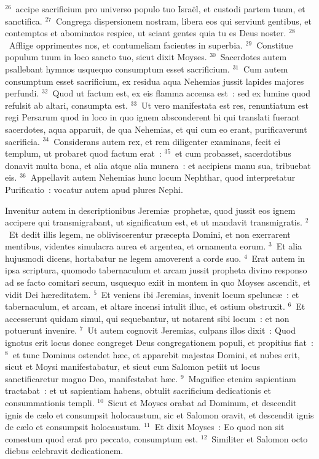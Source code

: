 ${}^{26}$~accipe sacrificium pro universo populo tuo Isra\"el, et custodi partem tuam, et sanctifica.
${}^{27}$~Congrega dispersionem nostram, libera eos qui serviunt gentibus, et contemptos et abominatos respice, ut sciant gentes quia tu es Deus noster.
${}^{28}$~Afflige opprimentes nos, et contumeliam facientes in superbia.
${}^{29}$~Constitue populum tuum in loco sancto tuo, sicut dixit Moyses.
${}^{30}$~Sacerdotes autem psallebant hymnos usquequo consumptum esset sacrificium.
${}^{31}$~Cum autem consumptum esset sacrificium, ex residua aqua Nehemias jussit lapides majores perfundi.
${}^{32}$~Quod ut factum est, ex eis flamma accensa est~: sed ex lumine quod refulsit ab altari, consumpta est.
${}^{33}$~Ut vero manifestata est res, renuntiatum est regi Persarum quod in loco in quo ignem absconderent hi qui translati fuerant sacerdotes, aqua apparuit, de qua Nehemias, et qui cum eo erant, purificaverunt sacrificia.
${}^{34}$~Considerans autem rex, et rem diligenter examinans, fecit ei templum, ut probaret quod factum erat~:
${}^{35}$~et cum probasset, sacerdotibus donavit multa bona, et alia atque alia munera~: et accipiens manu sua, tribuebat eis.
${}^{36}$~Appellavit autem Nehemias hunc locum Nephthar, quod interpretatur Purificatio~: vocatur autem apud plures Nephi.

\bchapter
\lettrine[lines=3,image=true,loversize=0.05,lraise=-0.03]{I}{}nvenitur autem in descriptionibus Jeremi\ae\ prophet\ae , quod jussit eos ignem accipere qui transmigrabant, ut significatum est, et ut mandavit transmigratis.
${}^{2}$~Et dedit illis legem, ne obliviscerentur pr\ae cepta Domini, et non exerrarent mentibus, videntes simulacra aurea et argentea, et ornamenta eorum.
${}^{3}$~Et alia hujusmodi dicens, hortabatur ne legem amoverent a corde suo.
${}^{4}$~Erat autem in ipsa scriptura, quomodo tabernaculum et arcam jussit propheta divino responso ad se facto comitari secum, usquequo exiit in montem in quo Moyses ascendit, et vidit Dei h\ae reditatem.
${}^{5}$~Et veniens ibi Jeremias, invenit locum spelunc\ae~: et tabernaculum, et arcam, et altare incensi intulit illuc, et ostium obstruxit.
${}^{6}$~Et accesserunt quidam simul, qui sequebantur, ut notarent sibi locum~: et non potuerunt invenire.
${}^{7}$~Ut autem cognovit Jeremias, culpans illos dixit~: Quod ignotus erit locus donec congreget Deus congregationem populi, et propitius fiat~:
${}^{8}$~et tunc Dominus ostendet h\ae c, et apparebit majestas Domini, et nubes erit, sicut et Moysi manifestabatur, et sicut cum Salomon petiit ut locus sanctificaretur magno Deo, manifestabat h\ae c.
${}^{9}$~Magnifice etenim sapientiam tractabat~: et ut sapientiam habens, obtulit sacrificium dedicationis et consummationis templi.
${}^{10}$~Sicut et Moyses orabat ad Dominum, et descendit ignis de c\ae lo et consumpsit holocaustum, sic et Salomon oravit, et descendit ignis de c\ae lo et consumpsit holocaustum.
${}^{11}$~Et dixit Moyses~: Eo quod non sit comestum quod erat pro peccato, consumptum est.
${}^{12}$~Similiter et Salomon octo diebus celebravit dedicationem.


